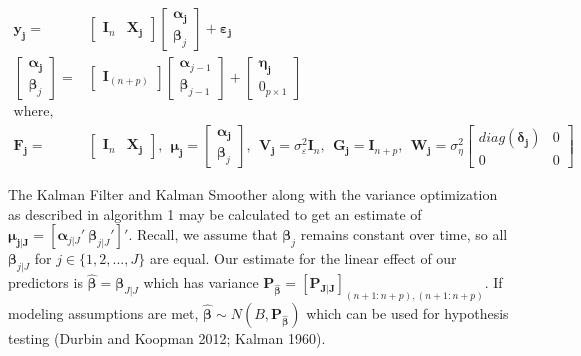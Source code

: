 \documentclass[
]{article}
\begin{document}
\begin{align*}
\boldsymbol{y_j} = &
\begin{bmatrix}
\boldsymbol{I}_n & \boldsymbol{X_j}
\end{bmatrix}
\begin{bmatrix}
\boldsymbol{\alpha_j}\\
\boldsymbol{\beta}_j
\end{bmatrix}
+ \boldsymbol{\varepsilon_j}\\
\begin{bmatrix}
\boldsymbol{\alpha_j}\\
\boldsymbol{\beta}_j
\end{bmatrix} = &
\begin{bmatrix}
\boldsymbol{I}_{(n+p)}
\end{bmatrix}
\begin{bmatrix}
\boldsymbol{\alpha}_{j-1}\\
\boldsymbol{\beta}_{j-1}
\end{bmatrix} + 
\begin{bmatrix}
\boldsymbol{\eta_j} \\
0_{p \times 1}
\end{bmatrix}\\
\text{where,}&\\ 
\boldsymbol{F_j} =& \begin{bmatrix}
\boldsymbol{I}_n & \boldsymbol{X_j}
\end{bmatrix}, \ \ \boldsymbol{\mu_j} = \begin{bmatrix}
\boldsymbol{\alpha_j}\\
\boldsymbol{\beta}_j
\end{bmatrix}, \ \ \boldsymbol{V_j} = \sigma^2_\varepsilon \boldsymbol{I}_n, \ \ \boldsymbol{G_j} = \boldsymbol{I}_{n+p}, \ \ \boldsymbol{W_j} = 
  \sigma^2_\eta\begin{bmatrix}
diag(\boldsymbol{\delta_j}) & 0\\
0 & 0
\end{bmatrix}
\end{align*}

The Kalman Filter and Kalman Smoother along with the variance optimization as described in algorithm 1 may be calculated to get an estimate of \(\boldsymbol{\mu_{j|J}} = [\boldsymbol{\alpha}_{j|J}' \ \boldsymbol{\beta}_{j|J}']'\). Recall, we assume that \(\boldsymbol{\beta}_j\) remains constant over time, so all \(\boldsymbol{\beta}_{j|J}\) for \(j\in \{1, 2, ..., J\}\) are equal. Our estimate for the linear effect of our predictors is \(\boldsymbol{\hat\beta} =\boldsymbol{\beta}_{J|J}\) which has variance \(\boldsymbol{P_{\boldsymbol{\hat\beta}} = [P_{J|J}]}_{(n+1:n+p), (n+1:n+p)}\). If modeling assumptions are met, \(\boldsymbol{\hat\beta} \sim N(B, \boldsymbol{P_{\boldsymbol{\hat\beta}}})\) which can be used for hypothesis testing (Durbin and Koopman 2012; Kalman 1960).
\end{document}
